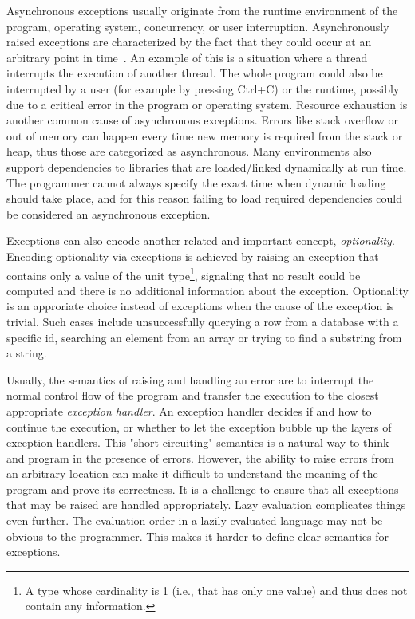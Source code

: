 Asynchronous exceptions usually originate from the runtime environment of the program, operating system, concurrency, or user interruption. Asynchronously raised exceptions are characterized by the fact that they could occur at an arbitrary point in time~\cite{async-exc}. An example of this is a situation where a thread interrupts the execution of another thread. The whole program could also be interrupted by a user (for example by pressing Ctrl+C) or the runtime, possibly due to a critical error in the program or operating system. Resource exhaustion is another common cause of asynchronous exceptions. Errors like stack overflow or out of memory can happen every time new memory is required from the stack or heap, thus those are categorized as asynchronous. Many environments also support dependencies to libraries that are loaded/linked  dynamically at run time. The programmer cannot always specify the exact time when dynamic loading should take place, and for this reason failing to load required dependencies could be considered an asynchronous exception.~\cite{akward-squad}

Exceptions can also encode another related and important concept, \emph{optionality}. Encoding optionality via exceptions is achieved by raising an exception that contains only a value of the unit type\footnote{A type whose cardinality is 1 (i.e., that has only one value) and thus does not contain any information.}, signaling that no result could be computed and there is no additional information about the exception. Optionality is an approriate choice instead of exceptions when the cause of the exception is trivial. Such cases include unsuccessfully querying a row from a database with a specific id, searching an element from an array or trying to find a substring from a string.

Usually, the semantics of raising and handling an error are to interrupt the normal control flow of the program and transfer the execution to the closest appropriate \emph{exception handler}. An exception handler decides if and how to continue the execution, or whether to let the exception bubble up the layers of exception handlers. This "short-circuiting" semantics is a natural way to think and program in the presence of errors. However, the ability to raise errors from an arbitrary location can make it difficult to understand the meaning of the program and prove its correctness. It is a challenge to ensure that all exceptions that may be raised are handled appropriately. Lazy evaluation complicates things even further. The evaluation order in a lazily evaluated language may not be obvious to the programmer. This makes it harder to define clear semantics for exceptions.~\cite{imprecise-exceptions}

